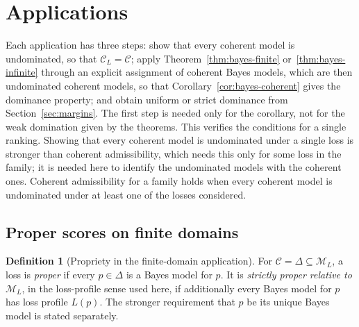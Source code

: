 \documentclass[11pt]{article}
\theoremstyle{definition}
\newtheorem{definition}[theorem]{Definition}
\theoremstyle{remark}
\newcommand{\M}{\mathcal M}
\newcommand{\C}{\mathcal C}
\begin{document}
\section{Applications}\label{sec:apps}
Each application has three steps: show that every coherent model is undominated, so that $\C_L=\C$; apply Theorem~\ref{thm:bayes-finite} or~\ref{thm:bayes-infinite} through an explicit assignment of coherent Bayes models, which are then undominated coherent models, so that Corollary~\ref{cor:bayes-coherent} gives the dominance property; and obtain uniform or strict dominance from Section~\ref{sec:margins}. The first step is needed only for the corollary, not for the weak domination given by the theorems. This verifies the conditions for a single ranking. Showing that every coherent model is undominated under a single loss is stronger than coherent admissibility, which needs this only for some loss in the family; it is needed here to identify the undominated models with the coherent ones. Coherent admissibility for a family holds when every coherent model is undominated under at least one of the losses considered.

\subsection{Proper scores on finite domains}\label{sec:proper}
\begin{definition}[Propriety in the finite-domain application]\label{def:propriety}
For $\C=\Delta\subseteq\M_L$, a loss is \emph{proper} if every $p\in\Delta$ is a
Bayes model for $p$. It is \emph{strictly proper relative to $\M_L$}, in the
loss-profile sense used here, if additionally every Bayes model for $p$ has loss profile
$L(p)$. The stronger requirement that $p$ be its unique Bayes model is stated separately.
\end{definition}
\end{document}
